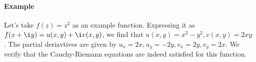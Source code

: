 
\paragraph{Example} Let's take $f(z) = z^2$ as an example function. Expressing it as $f(x + \i y) = u(x,y) + \i v(x,y)$, we find that $u(x,y) = x^2 - y^2, v(x,y) = 2 x y$. The partial deriavtives are given by $u_x = 2 x, u_y = - 2 y, v_x = 2 y, v_y = 2 x$. We verify that the Cauchy-Riemann equations are indeed satisfied for this function.





%




